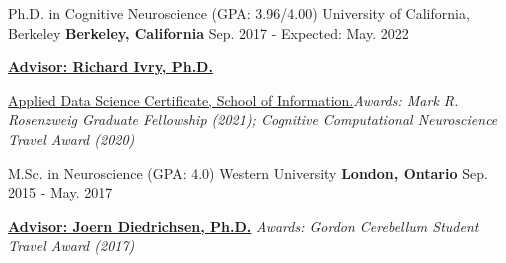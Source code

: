 

\begin{cventries}

  \cventry
    {Ph.D. in Cognitive Neuroscience (GPA: 3.96/4.00)} %
    {University of California, Berkeley} %
    {\textbf{Berkeley, California}} %
    {Sep. 2017 - Expected: May. 2022} %
    {
      \begin{cvitems} %
        \item {{\href{http://ivrylab.berkeley.edu/rich-ivry.html}{\textbf{Advisor: Richard Ivry, Ph.D.}}}}
        \item {{\href{https://www.ischool.berkeley.edu/programs/data-science-certificate}{Applied Data Science Certificate, School of Information.}}\textit{Awards: Mark R. Rosenzweig Graduate Fellowship (2021); Cognitive Computational Neuroscience Travel Award (2020)}}
      \end{cvitems}
    }

  \cventry
    {M.Sc. in Neuroscience (GPA: 4.0)} %
    {Western University} %
    {\textbf{London, Ontario}} %
    {Sep. 2015 - May. 2017} %
    {
      \begin{cvitems} %
        \item {{\href{http://www.diedrichsenlab.org/}{\textbf{Advisor: Joern Diedrichsen, Ph.D.}}} \textit{Awards: Gordon Cerebellum Student Travel Award (2017)}}
      \end{cvitems}
    }
    

\end{cventries}
